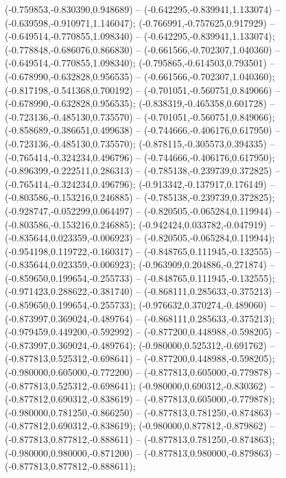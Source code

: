  (-0.759853,-0.830390,0.948689) -- (-0.642295,-0.839941,1.133074) -- (-0.639598,-0.910971,1.146047);
 (-0.766991,-0.757625,0.917929) -- (-0.649514,-0.770855,1.098340) -- (-0.642295,-0.839941,1.133074);
 (-0.778848,-0.686076,0.866830) -- (-0.661566,-0.702307,1.040360) -- (-0.649514,-0.770855,1.098340);
 (-0.795865,-0.614503,0.793501) -- (-0.678990,-0.632828,0.956535) -- (-0.661566,-0.702307,1.040360);
 (-0.817198,-0.541368,0.700192) -- (-0.701051,-0.560751,0.849066) -- (-0.678990,-0.632828,0.956535);
 (-0.838319,-0.465358,0.601728) -- (-0.723136,-0.485130,0.735570) -- (-0.701051,-0.560751,0.849066);
 (-0.858689,-0.386651,0.499638) -- (-0.744666,-0.406176,0.617950) -- (-0.723136,-0.485130,0.735570);
 (-0.878115,-0.305573,0.394335) -- (-0.765414,-0.324234,0.496796) -- (-0.744666,-0.406176,0.617950);
 (-0.896399,-0.222511,0.286313) -- (-0.785138,-0.239739,0.372825) -- (-0.765414,-0.324234,0.496796);
 (-0.913342,-0.137917,0.176149) -- (-0.803586,-0.153216,0.246885) -- (-0.785138,-0.239739,0.372825);
 (-0.928747,-0.052299,0.064497) -- (-0.820505,-0.065284,0.119944) -- (-0.803586,-0.153216,0.246885);
 (-0.942424,0.033782,-0.047919) -- (-0.835644,0.023359,-0.006923) -- (-0.820505,-0.065284,0.119944);
 (-0.954198,0.119722,-0.160317) -- (-0.848765,0.111945,-0.132555) -- (-0.835644,0.023359,-0.006923);
 (-0.963909,0.204886,-0.271874) -- (-0.859650,0.199654,-0.255733) -- (-0.848765,0.111945,-0.132555);
 (-0.971423,0.288622,-0.381740) -- (-0.868111,0.285633,-0.375213) -- (-0.859650,0.199654,-0.255733);
 (-0.976632,0.370274,-0.489060) -- (-0.873997,0.369024,-0.489764) -- (-0.868111,0.285633,-0.375213);
 (-0.979459,0.449200,-0.592992) -- (-0.877200,0.448988,-0.598205) -- (-0.873997,0.369024,-0.489764);
 (-0.980000,0.525312,-0.691762) -- (-0.877813,0.525312,-0.698641) -- (-0.877200,0.448988,-0.598205);
 (-0.980000,0.605000,-0.772200) -- (-0.877813,0.605000,-0.779878) -- (-0.877813,0.525312,-0.698641);
 (-0.980000,0.690312,-0.830362) -- (-0.877812,0.690312,-0.838619) -- (-0.877813,0.605000,-0.779878);
 (-0.980000,0.781250,-0.866250) -- (-0.877813,0.781250,-0.874863) -- (-0.877812,0.690312,-0.838619);
 (-0.980000,0.877812,-0.879862) -- (-0.877813,0.877812,-0.888611) -- (-0.877813,0.781250,-0.874863);
 (-0.980000,0.980000,-0.871200) -- (-0.877813,0.980000,-0.879863) -- (-0.877813,0.877812,-0.888611);

